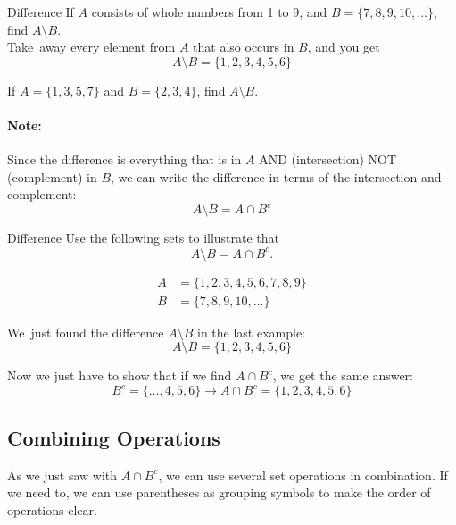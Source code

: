 \begin{example}[https://www.youtube.com/watch?v=XZrZRxQ8Axo]{Difference}
If $A$ consists of whole numbers from 1 to 9, and $B = \{7,8,9,10,\ldots\}$, find $A \setminus B$.\\

Take\sol\ away every element from $A$ that also occurs in $B$, and you get
\[A \setminus B = \{1,2,3,4,5,6\}\]
\end{example}

\begin{try}
If $A=\{1,3,5,7\}$ and $B=\{2,3,4\}$, find $A \setminus B$.
\end{try}

\paragraph{Note:} Since the difference is everything that is in $A$ AND (intersection) NOT (complement) in $B$, we can write the difference in terms of the intersection and complement:
\[A \setminus B = A \cap B^c\]

\begin{example}[https://www.youtube.com/watch?v=TYFOyfN9hnw]{Difference}
Use the following sets to illustrate that \[A \setminus B = A \cap B^c.\]

\begin{align*}
A &= \{1,2,3,4,5,6,7,8,9\}\\
B &= \{7,8,9,10,\ldots\}
\end{align*}

We\sol\ just found the difference $A \setminus B$ in the last example:
\[A \setminus B = \{1,2,3,4,5,6\}\]

Now we just have to show that if we find $A \cap B^c$, we get the same answer:
\[B^c = \{\ldots, 4,5,6\} \longrightarrow A \cap B^c = \{1,2,3,4,5,6\}\]

\end{example}

\subsection{Combining Operations}
As we just saw with $A \cap B^c$, we can use several set operations in combination.  If we need to, we can use parentheses as grouping symbols to make the order of operations clear.

